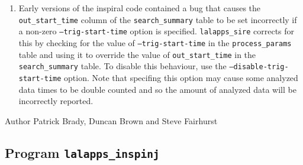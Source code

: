 \begin{entry}
\begin{enumerate}
\item Early versions of the inspiral code contained a bug that causes the
\verb$out_start_time$ column of the \verb$search_summary$ table to be set
incorrectly if a non-zero \texttt{--trig-start-time} option is specified.
\verb$lalapps_sire$ corrects for this by checking for the value of
\texttt{--trig-start-time} in the \verb$process_params$ table and using it to
override the value of \verb$out_start_time$ in the \verb$search_summary$
table. To disable this behaviour, use the \texttt{--disable-trig-start-time}
option. Note that specifing this option may cause some analyzed data times to
be double counted and so the amount of analyzed data will be incorrectly
reported.
\end{enumerate}

\item[Author] 
Patrick Brady, Duncan Brown and Steve Fairhurst
\end{entry}


\clearpage
\subsection{Program \texttt{lalapps\_inspinj}}
\label{program:lalapps-inspinj}

